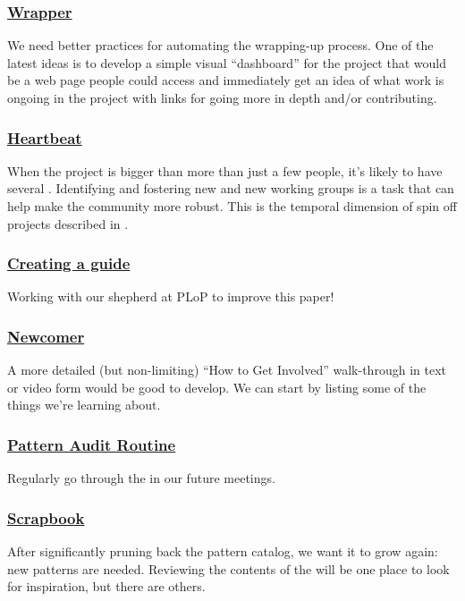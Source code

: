 \subsubsection*{\hyperref[sec:Wrapper]{Wrapper}}  We need better practices for automating the wrapping-up process. One of the latest ideas is to develop a simple visual ``dashboard'' for the project that would be a web page people could access and immediately get an idea of what work is ongoing in the project with links for going more in depth and/or contributing.

\subsubsection*{\hyperref[sec:Heartbeat]{Heartbeat}} When the project is bigger than more than just a few people, it's likely to have several .  Identifying and fostering new  and new working groups is a task that can help make the community more robust.  This is the temporal dimension of spin off projects described in .

\subsubsection*{\hyperref[sec:Creating_a_guide]{Creating a guide}}
Working with our shepherd at PLoP to improve this paper!

\subsubsection*{\hyperref[sec:Newcomer]{Newcomer}} A more detailed (but non-limiting) ``How to Get Involved'' walk-through in text or video form would be good to develop. We can start by listing some of the things we're learning about.

\subsubsection*{\hyperref[sec:Pattern_Audit_Routine]{Pattern Audit Routine}} Regularly go through the  in our future meetings.

\subsubsection*{\hyperref[sec:Scrapbook]{Scrapbook}} After significantly pruning back the pattern catalog, we want it to grow again: new patterns are needed.  Reviewing the contents of the  will be one place to look for inspiration, but there are others.




